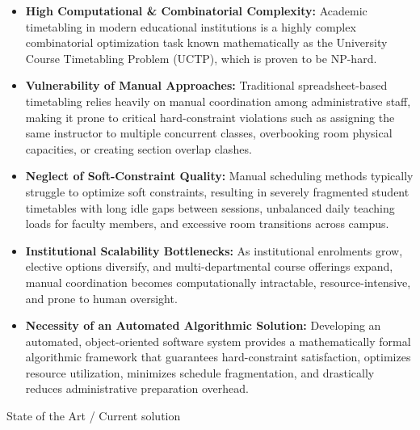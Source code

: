 \documentclass[11pt,a4paper]{article}
\newcommand{\blueheading}[1]{%
    {\sffamily\color{TitleBlue}\fontsize{15}{18}\selectfont #1}%
}
\newcommand{\answerbox}[2][]{%
    \vspace{2pt}\par
    \noindent
    {\itshape #2}\par
    \vspace{2pt}
}
\begin{document}
\answerbox{%
\begin{itemize}[leftmargin=*,noitemsep,topsep=2pt,itemsep=3pt]
    \item \textbf{High Computational & Combinatorial Complexity:} Academic timetabling in modern educational institutions is a highly complex combinatorial optimization task known mathematically as the University Course Timetabling Problem (UCTP), which is proven to be NP-hard.
    \item \textbf{Vulnerability of Manual Approaches:} Traditional spreadsheet-based timetabling relies heavily on manual coordination among administrative staff, making it prone to critical hard-constraint violations such as assigning the same instructor to multiple concurrent classes, overbooking room physical capacities, or creating section overlap clashes.
    \item \textbf{Neglect of Soft-Constraint Quality:} Manual scheduling methods typically struggle to optimize soft constraints, resulting in severely fragmented student timetables with long idle gaps between sessions, unbalanced daily teaching loads for faculty members, and excessive room transitions across campus.
    \item \textbf{Institutional Scalability Bottlenecks:} As institutional enrolments grow, elective options diversify, and multi-departmental course offerings expand, manual coordination becomes computationally intractable, resource-intensive, and prone to human oversight.
    \item \textbf{Necessity of an Automated Algorithmic Solution:} Developing an automated, object-oriented software system provides a mathematically formal algorithmic framework that guarantees hard-constraint satisfaction, optimizes resource utilization, minimizes schedule fragmentation, and drastically reduces administrative preparation overhead.
\end{itemize}
}

\vspace{5mm}

\blueheading{State of the Art / Current solution}

\vspace{1mm}
\end{document}
